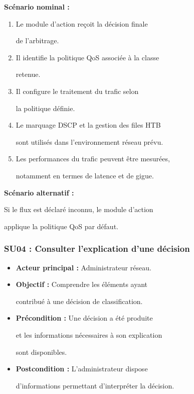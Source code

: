 \textbf{Scénario nominal :}

\begin{enumerate}

    \item Le module d'action reçoit la décision finale

    de l'arbitrage.

    \item Il identifie la politique QoS associée à la classe

    retenue.

    \item Il configure le traitement du trafic selon

    la politique définie.

    \item Le marquage DSCP et la gestion des files HTB

    sont utilisés dans l'environnement réseau prévu.

    \item Les performances du trafic peuvent être mesurées,

    notamment en termes de latence et de gigue.

\end{enumerate}



\textbf{Scénario alternatif :}

Si le flux est déclaré inconnu, le module d'action

applique la politique QoS par défaut.





\subsubsection{SU04 : Consulter l'explication d'une décision}



\begin{itemize}

    \item \textbf{Acteur principal :} Administrateur réseau.

    \item \textbf{Objectif :} Comprendre les éléments ayant

    contribué à une décision de classification.

    \item \textbf{Précondition :} Une décision a été produite

    et les informations nécessaires à son explication

    sont disponibles.

    \item \textbf{Postcondition :} L'administrateur dispose

    d'informations permettant d'interpréter la décision.

\end{itemize}



